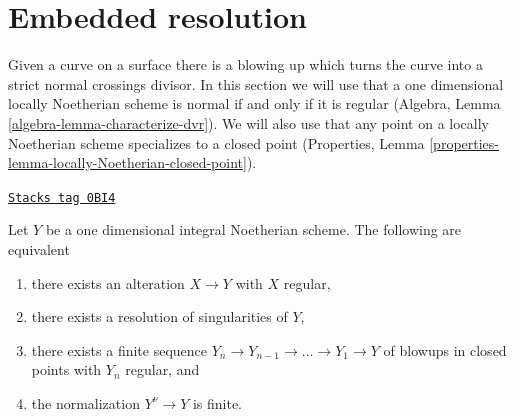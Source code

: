 \section{Embedded resolution}
\label{resolve-section-embedded}
Given a curve on a surface there is a blowing up which turns the
curve into a strict normal crossings divisor. In this section we
will use that a one dimensional locally Noetherian scheme is normal if
and only if it is regular
(Algebra, Lemma \ref{algebra-lemma-characterize-dvr}).
We will also use that any point on a locally Noetherian
scheme specializes to a closed point
(Properties, Lemma \ref{properties-lemma-locally-Noetherian-closed-point}).

\begin{lemma}
\label{resolve-lemma-resolve-curve}
\href{https://stacks.math.columbia.edu/tag/0BI4}{\texttt{Stacks tag 0BI4}}

Let $Y$ be a one dimensional integral Noetherian scheme.
The following are equivalent
\begin{enumerate}
\item there exists an alteration $X \to Y$ with $X$ regular,
\item there exists a resolution of singularities of $Y$,
\item there exists a finite sequence
$Y_n \to Y_{n - 1} \to \ldots \to Y_1 \to Y$ of blowups
in closed points with $Y_n$ regular, and
\item the normalization $Y^\nu \to Y$ is finite.
\end{enumerate}
\end{lemma}


